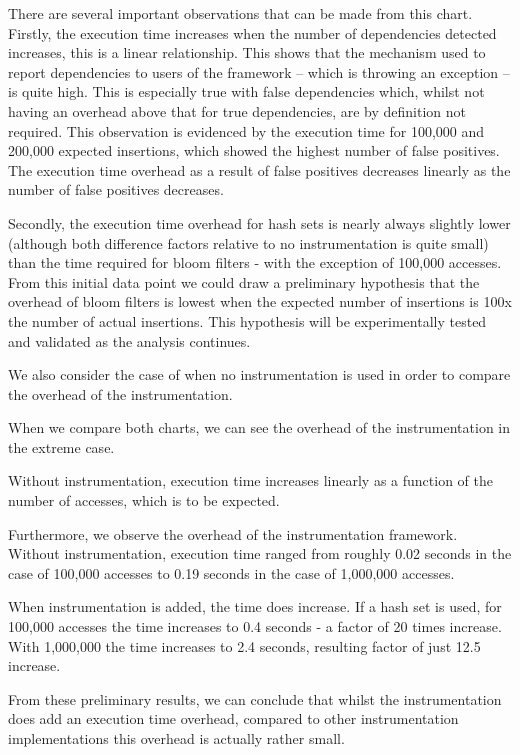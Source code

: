 		There are several important observations that can be made from this chart. Firstly, the execution time increases when the number of dependencies detected increases, this is a linear relationship. This shows that the mechanism used to report dependencies to users of the framework -- which is throwing an exception -- is quite high. This is especially true with false dependencies which, whilst not having an overhead above that for true dependencies, are by definition not required. This observation is evidenced by the execution time for 100,000 and 200,000 expected insertions, which showed the highest number of false positives. The execution time overhead as a result of false positives decreases linearly as the number of false positives decreases.
		
		Secondly, the execution time overhead for hash sets is nearly always slightly lower (although both difference factors relative to no instrumentation is quite small) than the time required for bloom filters - with the exception of 100,000 accesses. From this initial data point we could draw a preliminary hypothesis that the overhead of bloom filters is lowest when the expected number of insertions is 100x the number of actual insertions. This hypothesis will be experimentally tested and validated as the analysis continues.
		
		We also consider the case of when no instrumentation is used in order to compare the overhead of the instrumentation.
		
		When we compare both charts, we can see the overhead of the instrumentation in the extreme case.
		
		Without instrumentation, execution time increases linearly as a function of the number of accesses, which is to be expected.
		
		Furthermore, we observe the overhead of the instrumentation framework. Without instrumentation, execution time ranged from roughly 0.02 seconds in the case of 100,000 accesses to 0.19 seconds in the case of 1,000,000 accesses.
		
		When instrumentation is added, the time does increase. If a hash set is used, for 100,000 accesses the time increases to 0.4 seconds - a factor of 20 times increase. With 1,000,000 the time increases to 2.4 seconds, resulting factor of just 12.5 increase.
		
		From these preliminary results, we can conclude that whilst the instrumentation does add an execution time overhead, compared to other instrumentation implementations this overhead is actually rather small.
		
